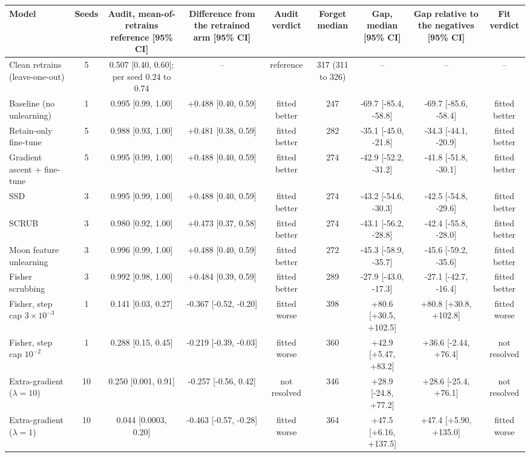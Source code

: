 \begin{tabular}{lcccccccc}
\toprule
Model & Seeds & Audit, mean-of-retrains reference [95\% CI] & Difference from the retrained arm [95\% CI] & Audit verdict & Forget median & Gap, median [95\% CI] & Gap relative to the negatives [95\% CI] & Fit verdict \\
\midrule
Clean retrains (leave-one-out) & 5 & 0.507 [0.40, 0.60]; per seed 0.24 to 0.74 & -- & reference & 317 (311 to 326) & -- & -- & -- \\
Baseline (no unlearning) & 1 & 0.995 [0.99, 1.00] & +0.488 [0.40, 0.59] & fitted better & 247 & -69.7 [-85.4, -58.8] & -69.7 [-85.6, -58.4] & fitted better \\
Retain-only fine-tune & 5 & 0.988 [0.93, 1.00] & +0.481 [0.38, 0.59] & fitted better & 282 & -35.1 [-45.0, -21.8] & -34.3 [-44.1, -20.9] & fitted better \\
Gradient ascent + fine-tune & 5 & 0.995 [0.99, 1.00] & +0.488 [0.40, 0.59] & fitted better & 274 & -42.9 [-52.2, -31.2] & -41.8 [-51.8, -30.1] & fitted better \\
SSD & 3 & 0.995 [0.99, 1.00] & +0.488 [0.40, 0.59] & fitted better & 274 & -43.2 [-54.6, -30.3] & -42.5 [-54.8, -29.6] & fitted better \\
SCRUB & 3 & 0.980 [0.92, 1.00] & +0.473 [0.37, 0.58] & fitted better & 274 & -43.1 [-56.2, -28.8] & -42.4 [-55.8, -28.0] & fitted better \\
Moon feature unlearning & 3 & 0.996 [0.99, 1.00] & +0.488 [0.40, 0.59] & fitted better & 272 & -45.3 [-58.9, -35.7] & -45.6 [-59.2, -35.6] & fitted better \\
Fisher scrubbing & 3 & 0.992 [0.98, 1.00] & +0.484 [0.39, 0.59] & fitted better & 289 & -27.9 [-43.0, -17.3] & -27.1 [-42.7, -16.4] & fitted better \\
Fisher, step cap $3\times 10^{-3}$ & 1 & 0.141 [0.03, 0.27] & -0.367 [-0.52, -0.20] & fitted worse & 398 & +80.6 [+30.5, +102.5] & +80.8 [+30.8, +102.8] & fitted worse \\
Fisher, step cap $10^{-2}$ & 1 & 0.288 [0.15, 0.45] & -0.219 [-0.39, -0.03] & fitted worse & 360 & +42.9 [+5.47, +83.2] & +36.6 [-2.44, +76.4] & not resolved \\
Extra-gradient ($\lambda=10$) & 10 & 0.250 [0.001, 0.91] & -0.257 [-0.56, 0.42] & not resolved & 346 & +28.9 [-24.8, +77.2] & +28.6 [-25.4, +76.1] & not resolved \\
Extra-gradient ($\lambda=1$) & 10 & 0.044 [0.0003, 0.20] & -0.463 [-0.57, -0.28] & fitted worse & 364 & +47.5 [+6.16, +137.5] & +47.4 [+5.90, +135.0] & fitted worse \\

\end{tabular}
